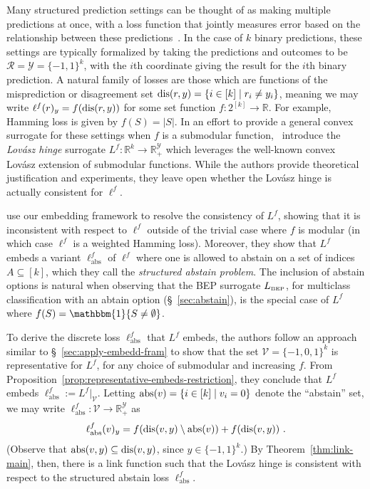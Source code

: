 \documentclass[twoside,11pt]{article}
\newcommand{\reals}{\mathbb{R}}
\newcommand{\BEP}{L_{\text{\tiny BEP}}}
\newcommand{\R}{\mathcal{R}}
\newcommand{\V}{\mathcal{V}}
\newcommand{\Y}{\mathcal{Y}}
\newcommand{\ones}{\mathbbm{1}}
\newcommand{\ellabs}{\ell_{\text{abs}}^f}
\begin{document}
Many structured prediction settings can be thought of as making multiple predictions at once, with a loss function that jointly measures error based on the relationship between these predictions~\citep{hazan2010direct, gao2011consistency, osokin2017structured}.
In the case of $k$ binary predictions, these settings are typically formalized by taking the predictions and outcomes to be $\R=\Y=\{-1,1\}^k$, with the $i$th coordinate giving the result for the $i$th binary prediction.
A natural family of losses are those which are functions of the misprediction or disagreement set $\mathrm{dis}(r,y) = \{i \in [k] \mid r_i \neq y_i\}$, meaning we may write $\ell^f(r)_y = f(\mathrm{dis}(r,y))$ for some set function $f:2^{[k]}\to\reals$.
For example, Hamming loss is given by $f(S) = |S|$.
In an effort to provide a general convex surrogate for these settings when $f$ is a submodular function,~\citet{yu2018lovasz} introduce the \emph{Lov\'asz hinge} surrogate $L^f:\reals^k\to\reals^\Y_+$ which leverages the well-known convex Lov\'asz extension of submodular functions.
While the authors provide theoretical justification and experiments, they leave open whether the Lov\'asz hinge is actually consistent for $\ell^f$.

\citet{ourlovaszpaper} use our embedding framework to resolve the consistency of $L^f$, showing that it is inconsistent with respect to $\ell^f$ outside of the trivial case where $f$ is modular (in which case $\ell^f$ is a weighted Hamming loss).
Moreover, they show that $L^f$ embeds a variant $\ellabs$ of $\ell^f$ where one is allowed to abstain on a set of indices $A \subseteq [k]$, which they call the \emph{structured abstain problem}.
The inclusion of abstain options is natural when observing that the BEP surrogate $\BEP$, for multiclass classification with an abtain option (\S~\ref{sec:abstain}), is the special case of $L^f$ where $f(S) = \ones\{S \neq \emptyset\}$.

To derive the discrete loss $\ellabs$ that $L^f$ embeds, the authors follow an approach similar to \S~\ref{sec:apply-embedd-fram} to show that the set $\V = \{-1,0,1\}^k$ is representative for $L^f$, for any choice of submodular and increasing $f$.
From Proposition~\ref{prop:representative-embeds-restriction}, they conclude that $L^f$ embeds $\ellabs := L^f|_{\V}$.
Letting $\mathrm{abs}(v) = \{i\in[k] \mid v_i = 0\}$ denote the ``abstain'' set, we may write $\ellabs : \V \to \reals^\Y_+$ as
\begin{equation}
	\ellabs(v)_y = f(\dis(v,y) \setminus \abs(v)) + f(\dis(v,y))~.
\end{equation}
(Observe that $\mathrm{abs}(v,y) \subseteq \mathrm{dis}(v,y)$, since $y\in\{-1,1\}^k$.)
By Theorem~\ref{thm:link-main}, then, there is a link function such that the Lov\'asz hinge is consistent with respect to the structured abstain loss $\ellabs$.
\end{document}
